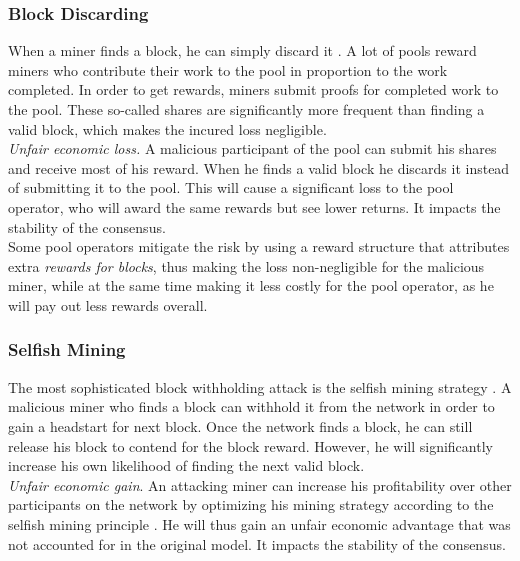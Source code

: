 \documentclass[12pt,a4paper]{article}
\begin{document}
\subsubsection{Block Discarding}

When a miner finds a block, he can simply discard it \cite{less}. A lot of \glspl{pool} reward \glspl{miner} who contribute their work to the \gls{pool} in proportion to the work completed. In order to get rewards, \glspl{miner} submit proofs for completed work to the \gls{pool}. These so-called shares are significantly more frequent than finding a valid \gls{block}, which makes the incured loss negligible.\\

\textit{Unfair economic loss.} A malicious participant of the \gls{pool} can submit his shares and receive most of his \gls{reward}. When he finds a valid \gls{block} he discards it instead of submitting it to the \gls{pool}. This will cause a significant loss to the pool operator, who will award the same rewards but see lower returns. It impacts the stability of the \gls{consensus}.\\

Some pool operators mitigate the risk by using a reward structure that attributes extra \textit{rewards for blocks}, thus making the loss non-negligible for the malicious miner, while at the same time making it less costly for the \gls{pool} operator, as he will pay out less rewards overall.\\

\subsubsection{Selfish Mining}

The most sophisticated block withholding attack is the selfish mining strategy \cite{selfish}. A malicious miner who finds a block can withhold it from the network in order to gain a headstart for next block. Once the network finds a block, he can still release his block to contend for the block reward. However, he will significantly increase his own likelihood of finding the next valid block.\\

\textit{Unfair economic gain}. An attacking miner can increase his profitability over other participants on the network by optimizing his mining strategy according to the selfish mining principle \cite{optimal}. He will thus gain an unfair economic advantage that was not accounted for in the original model. It impacts the stability of the \gls{consensus}.
\end{document}

